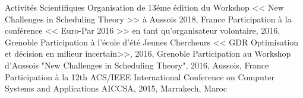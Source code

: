 \begin{rubric}{Activités Scientifiques}
    \entry*[]	Organisation de 13éme édition du Workshop << New Challenges in Scheduling Theory >> à Aussois 2018, France 
\entry*[]	Participation à la conférence << Euro-Par 2016 >> en tant qu'organisateur volontaire, 2016, Grenoble 
\entry*[]	Participation à l'école d'été Jeunes Chercheurs << GDR Optimisation et décision en milieur incertain>>, 2016, Grenoble 	
\entry*[]	Participation au Workshop d'Aussois "New Challenges in Scheduling Theory", 2016, Aussois, France	
\entry*[]	Participation à la 12th ACS/IEEE International Conference on Computer Systems and Applications AICCSA, 2015, Marrakech, Maroc 	
\end{rubric}

